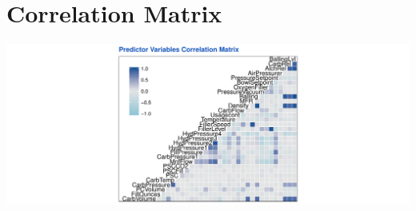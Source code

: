\documentclass[]{report}
\begin{document}
\hypertarget{correlation-matrix}{%
\section{Correlation Matrix}\label{correlation-matrix}}

\begin{center}\includegraphics{Proj2-JM_files/figure-latex/unnamed-chunk-12-1} \end{center}
\end{document}
